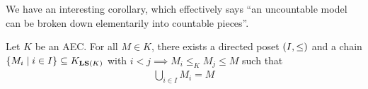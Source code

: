 We have an interesting corollary, which effectively says ``an uncountable model can be broken down elementarily into countable pieces''.

\begin{boxcorollary}
    Let $K$ be an AEC. For all $M \in K$, there exists a directed poset $\left( I, \leq \right)$ and a chain $\left\{ M_i \; \middle\vert \; i \in I \right\} \subseteq K_{\mathbf{LS}(K)}$ with $i < j \implies M_i \leq_K M_j \leq M$ such that
    \begin{align*}
        \bigcup_{i \in I} M_i = M
    \end{align*}
\end{boxcorollary}